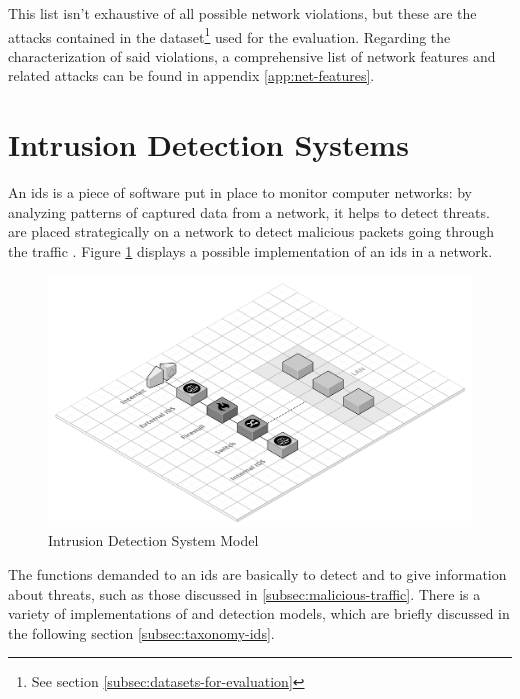 This list isn't exhaustive of all possible network violations, but these are the attacks contained in the dataset\footnote{See section \ref{subsec:datasets-for-evaluation}} used for the evaluation. Regarding the characterization of said violations, a comprehensive list of network features and related attacks can be found in appendix \ref{app:net-features}.
\textcolor{dimgray}{\lipsum[1]}


\section{Intrusion Detection Systems}
\label{sec:intrusion-detection-system}

An \gls{ids} is a piece of software put in place to monitor computer networks: by analyzing patterns of captured data from a network, it helps to detect threats.  are placed strategically on a network to detect malicious packets going through the traffic \cite{Hodo2017}. Figure \ref{fig:IDS-model} displays a possible implementation of an \gls{ids} in a network.

\begin{figure}[h!]
        \centering
        \includegraphics[scale=0.2]{figures/Intrusion Detection System Model.png}
        \caption{Intrusion Detection System Model}
        \label{fig:IDS-model}
\end{figure}
The functions demanded to an \gls{ids} are basically to detect and to give information about threats, such as those discussed in \ref{subsec:malicious-traffic}. There is a variety of implementations of  and detection models, which are briefly discussed in the following section \ref{subsec:taxonomy-ids}.

